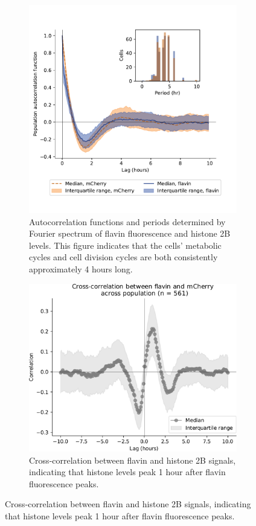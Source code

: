 \begin{figure}
\begin{subfigure}[htpb]{1.0\textwidth}
  \end{subfigure}
  \begin{subfigure}[t]{0.45\textwidth}
   \centering
   \includegraphics[width=\textwidth]{htb2mCherry_31594_12.pdf}
   \caption{
     Autocorrelation functions and periods determined by Fourier spectrum of flavin fluorescence and histone 2B levels.
     This figure indicates that the cells' metabolic cycles and cell division cycles are both consistently approximately 4 hours long.
   }
   \label{fig:biology-pyruvate-acf}
  \end{subfigure}%
  \begin{subfigure}[t]{0.45\textwidth}
   \centering
   \includegraphics[width=\textwidth]{pyruvate_xcf_edit.pdf}
   \caption{
    Cross-correlation between flavin and histone 2B signals, indicating that histone levels peak 1 hour after flavin fluorescence peaks.
   }
   \label{fig:biology-pyruvate-xcf}
  \end{subfigure}


\end{figure}
